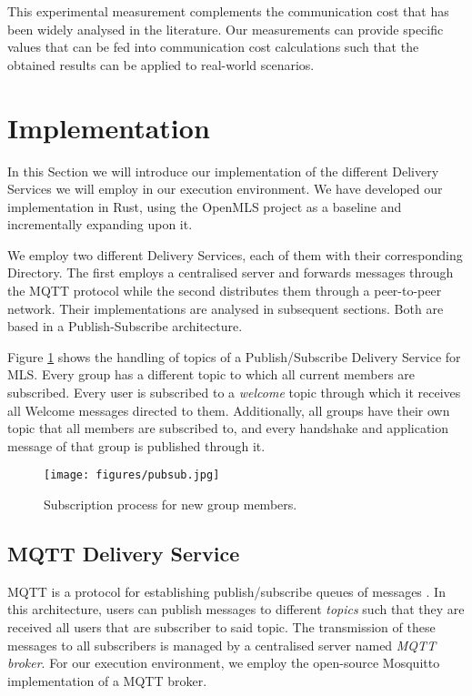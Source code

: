 \documentclass[preprint, 12pt]{elsarticle}
\begin{document}
This experimental measurement complements the communication cost that has been widely analysed in the literature. Our measurements can provide specific values that can be fed into communication cost calculations such that the obtained results can be applied to real-world scenarios.

\section{Implementation}
\label{sec:impl}

In this Section we will introduce our implementation of the different Delivery Services we will employ in our execution environment. We have developed our implementation in Rust, using the OpenMLS project \cite{openmls} as a baseline and incrementally expanding upon it.

We employ two different Delivery Services, each of them with their corresponding Directory. The first employs a centralised server and forwards messages through the MQTT protocol while the second distributes them through a peer-to-peer network. Their implementations are analysed in subsequent sections. Both are based in a Publish-Subscribe architecture.

Figure \ref{fig:pubsub} shows the handling of topics of a Publish/Subscribe Delivery Service for MLS. Every group has a different topic to which all current members are subscribed. Every user is subscribed to a \textit{welcome} topic through which it receives all Welcome messages directed to them. Additionally, all groups have their own topic that all members are subscribed to, and every handshake and application message of that group is published through it. 

\begin{figure}[!t]
\centering
\texttt{[image: figures/pubsub.jpg]}
\caption{Subscription process for new group members.}
\label{fig:pubsub}
\end{figure}

\subsection{MQTT Delivery Service}

MQTT is a protocol for establishing publish/subscribe queues of messages \cite{mqtt}. In this architecture, users can publish messages to different \textit{topics} such that they are received all users that are subscriber to said topic. The transmission of these messages to all subscribers is managed by a centralised server named \textit{MQTT broker}. For our execution environment, we employ the open-source Mosquitto \cite{mosquitto} implementation of a MQTT broker. 
\end{document}
